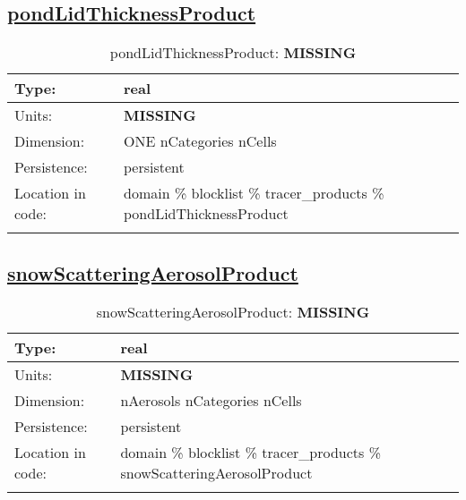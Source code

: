 \subsection[pondLidThicknessProduct]{\hyperref[sec:var_tab_tracer_products]{pondLidThicknessProduct}}
\label{subsec:var_sec_tracer_products_pondLidThicknessProduct}
\begin{center}
\begin{longtable}{| p{2.0in} | p{4.0in} |}
        \hline 
        Type: & real \\
        \hline 
        Units: & {\bf \color{red} MISSING} \\
        \hline 
        Dimension: & ONE nCategories nCells \\
        \hline 
        Persistence: & persistent \\
        \hline 
         Location in code: & domain \% blocklist \% tracer\_products \% pondLidThicknessProduct \\
         \hline 
    \caption{pondLidThicknessProduct: {\bf \color{red} MISSING}}
\end{longtable}
\end{center}
\subsection[snowScatteringAerosolProduct]{\hyperref[sec:var_tab_tracer_products]{snowScatteringAerosolProduct}}
\label{subsec:var_sec_tracer_products_snowScatteringAerosolProduct}
\begin{center}
\begin{longtable}{| p{2.0in} | p{4.0in} |}
        \hline 
        Type: & real \\
        \hline 
        Units: & {\bf \color{red} MISSING} \\
        \hline 
        Dimension: & nAerosols nCategories nCells \\
        \hline 
        Persistence: & persistent \\
        \hline 
         Location in code: & domain \% blocklist \% tracer\_products \% snowScatteringAerosolProduct \\
         \hline 
    \caption{snowScatteringAerosolProduct: {\bf \color{red} MISSING}}
\end{longtable}
\end{center}
